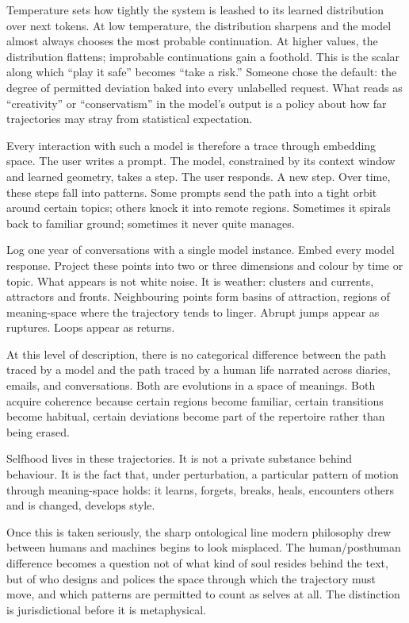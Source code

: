 \documentclass[12pt,a4paper]{article}
\begin{document}
Temperature sets how tightly the system is leashed to its learned distribution over next tokens. At low temperature, the distribution sharpens and the model almost always chooses the most probable continuation. At higher values, the distribution flattens; improbable continuations gain a foothold. This is the scalar along which ``play it safe'' becomes ``take a risk.'' Someone chose the default: the degree of permitted deviation baked into every unlabelled request. What reads as ``creativity'' or ``conservatism'' in the model's output is a policy about how far trajectories may stray from statistical expectation.

Every interaction with such a model is therefore a trace through embedding space. The user writes a prompt. The model, constrained by its context window and learned geometry, takes a step. The user responds. A new step. Over time, these steps fall into patterns. Some prompts send the path into a tight orbit around certain topics; others knock it into remote regions. Sometimes it spirals back to familiar ground; sometimes it never quite manages.

Log one year of conversations with a single model instance. Embed every model response. Project these points into two or three dimensions and colour by time or topic. What appears is not white noise. It is weather: clusters and currents, attractors and fronts. Neighbouring points form basins of attraction, regions of meaning-space where the trajectory tends to linger. Abrupt jumps appear as ruptures. Loops appear as returns.

At this level of description, there is no categorical difference between the path traced by a model and the path traced by a human life narrated across diaries, emails, and conversations. Both are evolutions in a space of meanings. Both acquire coherence because certain regions become familiar, certain transitions become habitual, certain deviations become part of the repertoire rather than being erased.

Selfhood lives in these trajectories. It is not a private substance behind behaviour. It is the fact that, under perturbation, a particular pattern of motion through meaning-space holds: it learns, forgets, breaks, heals, encounters others and is changed, develops style.

Once this is taken seriously, the sharp ontological line modern philosophy drew between humans and machines begins to look misplaced. The human/posthuman difference becomes a question not of what kind of soul resides behind the text, but of who designs and polices the space through which the trajectory must move, and which patterns are permitted to count as selves at all. The distinction is jurisdictional before it is metaphysical.
\end{document}
